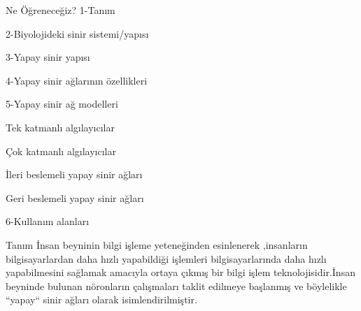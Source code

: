 \documentclass{beamer}                                                                                          %
\begin{document}
    \begin{frame}{Ne Öğreneceğiz?}
		    \color{myred1}1-\color{black}Tanım \par \vspace{5}
		    \color{myred1}2-\color{black}Biyolojideki sinir sistemi/yapısı\par \vspace{5}
		    \color{myred1}3-\color{black}Yapay sinir yapısı\par \vspace{5}
		    \color{myred1}4-\color{black}Yapay sinir ağlarının özellikleri\par \vspace{5}
		    \color{myred1}5-\color{black}Yapay sinir ağ modelleri\par \vspace{5}
		        \hspace{10}\color{myred1} \color{black}Tek katmanlı algılayıcılar \hspace{10}\par \vspace{5}
		        \hspace{10}\color{myred1} \color{black}Çok katmanlı algılayıcılar \par \vspace{5}
		        \hspace{10}\color{myred1} \color{black}İleri beslemeli yapay sinir ağları \par \vspace{5}
		        \hspace{10}\color{myred1} \color{black}Geri beslemeli yapay sinir ağları \par \vspace{5}
            \color{myred1}6-\color{black}Kullanım alanları
    \end{frame}
    
	
	\begin{frame}{Tanım }
	    \justifying
		    İnsan beyninin bilgi işleme yeteneğinden esinlenerek ,insanların bilgisayarlardan daha hızlı yapabildiği işlemleri bilgisayarlarında daha hızlı yapabilmesini sağlamak amacıyla ortaya çıkmış bir bilgi işlem teknolojisidir.İnsan beyninde bulunan nöronların çalışmaları taklit edilmeye başlanmış ve böylelikle “yapay“ sinir ağları olarak isimlendirilmiştir.
    \end{frame}
    
	
\end{document}

